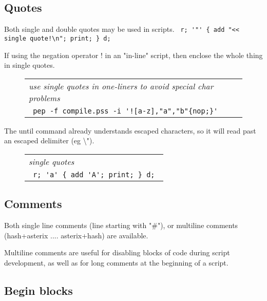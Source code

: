 \documentclass[a4paper,12pt]{article}
\begin{document}
\subsection{Quotes}

  Both single and double quotes may be used in scripts. 
 \verb| r; '"' { add "<< single quote!\n"; print; } d; |


  If using the negation operator ! in an "in-line" script, then
  enclose the whole thing in single quotes.
 \begin{figure}
 \begin{tabular}{ l }
 \emph{ use single quotes in one-liners to avoid special char problems } \\ 
 \verb| pep -f compile.pss -i '![a-z],"a","b"{nop;}' |
 \end{tabular} 
 \end{figure}

  The until command already understands escaped characters, so it
  will read past an escaped delimiter (eg \textbackslash ").
 \begin{figure}
 \begin{tabular}{ l }
 \emph{ single quotes } \\ 
 \verb| r; 'a' { add 'A'; print; } d; |
 \end{tabular} 
 \end{figure}

\subsection{Comments}
   
  Both single line comments (line starting with "\#"), or multiline
  comments (hash+asterix .... asterix+hash) are available.

  Multiline comments are useful for disabling blocks of code
  during script development, as well as for long comments at the
  beginning of a script.

\subsection{Begin blocks}
\end{document}
